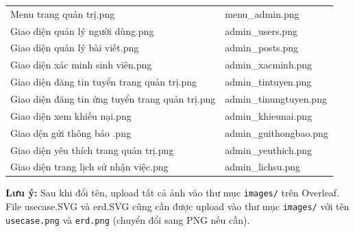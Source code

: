 \documentclass[a4paper,12pt]{report}
\begin{document}
\begin{table}[H]
\begin{tabular}{|l|l|}
Menu trang quản trị.png & menu\_admin.png \\
Giao diện quản lý người dùng.png & admin\_users.png \\
Giao diện quản lý bài viết.png & admin\_posts.png \\
Giao diện xác minh sinh viên.png & admin\_xacminh.png \\
Giao diện đăng tin tuyển trang quản trị.png & admin\_tintuyen.png \\
Giao diện đăng tin ứng tuyển trang quản trị.png & admin\_tinungtuyen.png \\
Giao diện xem khiếu nại.png & admin\_khieunai.png \\
Giao dện gửi thông báo .png & admin\_guithongbao.png \\
Giao diện yêu thích trang quản trị.png & admin\_yeuthich.png \\
Giao diện trang lịch sử nhận việc.png & admin\_lichsu.png \\
\hline
\end{tabular}
\end{table}

\textbf{Lưu ý:} Sau khi đổi tên, upload tất cả ảnh vào thư mục \texttt{images/} trên Overleaf. File usecase.SVG và erd.SVG cũng cần được upload vào thư mục \texttt{images/} với tên \texttt{usecase.png} và \texttt{erd.png} (chuyển đổi sang PNG nếu cần).
\end{document}
